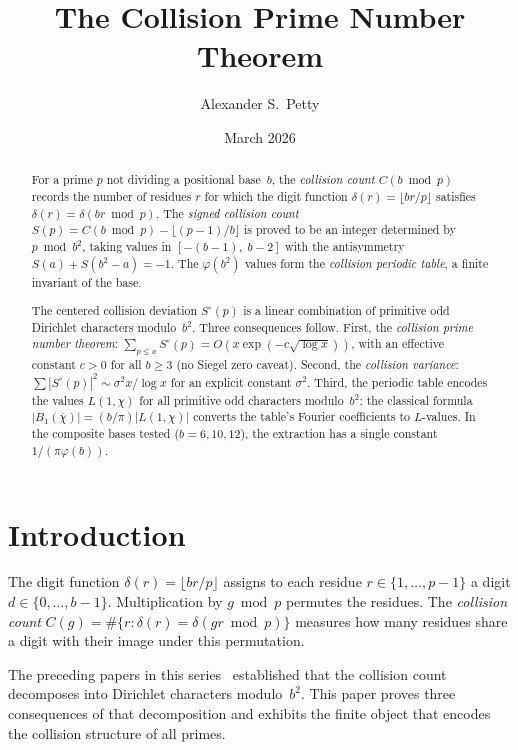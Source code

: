 \documentclass[12pt]{amsart}
\title{The Collision Prime Number Theorem}
\author{Alexander S.\ Petty}
\date{March 2026}
\theoremstyle{definition}
\theoremstyle{remark}
\begin{document}
\begin{abstract}
For a prime $p$ not dividing a positional base~$b$, the
\emph{collision count} $C(b \bmod p)$ records the number of
residues $r$ for which the digit function
$\delta(r) = \lfloor br/p \rfloor$ satisfies
$\delta(r) = \delta(br \bmod p)$. The \emph{signed collision
count} $S(p) = C(b \bmod p) - \lfloor(p{-}1)/b\rfloor$ is
proved to be an integer determined by $p \bmod b^2$, taking
values in $[-(b{-}1),\; b{-}2]$ with the antisymmetry
$S(a) + S(b^2{-}a) = -1$. The $\varphi(b^2)$ values form
the \emph{collision periodic table}, a finite invariant of
the base.

The centered collision deviation
$S^{\circ}(p)$ is a linear combination of primitive odd
Dirichlet characters modulo~$b^2$. Three consequences follow.
First, the \emph{collision prime number theorem}:
$\sum_{p \le x} S^{\circ}(p) =
O(x \exp(-c\sqrt{\log x}))$,
with an effective constant $c > 0$ for all $b \ge 3$
(no Siegel zero caveat). Second, the \emph{collision
variance}: $\sum |S^{\circ}(p)|^2 \sim \sigma^2 x / \log x$
for an explicit constant $\sigma^2$. Third, the periodic table encodes the values
$L(1, \chi)$ for all primitive odd characters
modulo~$b^2$: the classical formula
$|B_1(\overline{\chi})| = (b/\pi) |L(1,\chi)|$
converts the table's Fourier coefficients to $L$-values.
In the composite bases tested ($b = 6, 10, 12$), the
extraction has a single constant $1/(\pi \varphi(b))$.
\end{abstract}
\maketitle

\section{Introduction}

The digit function $\delta(r) = \lfloor br/p \rfloor$ assigns
to each residue $r \in \{1, \ldots, p{-}1\}$ a digit
$d \in \{0, \ldots, b{-}1\}$. Multiplication by $g \bmod p$
permutes the residues. The \emph{collision count}
$C(g) = \#\{r : \delta(r) = \delta(gr \bmod p)\}$ measures
how many residues share a digit with their image under this
permutation.

The preceding papers in this series~\cite{paperA,paperB,paperC}
established that the collision count decomposes into Dirichlet
characters modulo~$b^2$. This paper proves three consequences
of that decomposition and exhibits the finite object that
encodes the collision structure of all primes.
\end{document}
